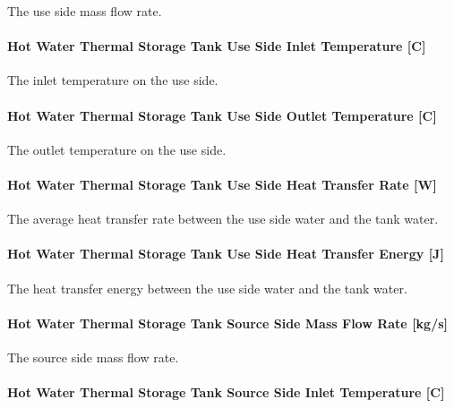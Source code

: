 The use side mass flow rate.

\paragraph{Hot Water Thermal Storage Tank Use Side Inlet Temperature
{[}C{]}}\label{hot-water-thermal-storage-use-side-inlet-temperature-thermalstoragehotwaterstratified}

The inlet temperature on the use side.

\paragraph{Hot Water Thermal Storage Tank Use Side Outlet Temperature
{[}C{]}}\label{hot-water-thermal-storage-use-side-outlet-temperature-thermalstoragehotwaterstratified}

The outlet temperature on the use side.

\paragraph{Hot Water Thermal Storage Tank Use Side Heat Transfer Rate
{[}W{]}}\label{hot-water-thermal-storage-use-side-heat-transfer-rate-thermalstoragehotwaterstratified}

The average heat transfer rate between the use side water and the tank water.

\paragraph{Hot Water Thermal Storage Tank Use Side Heat Transfer Energy
{[}J{]}}\label{hot-water-thermal-storage-use-side-heat-transfer-energy-thermalstoragehotwaterstratified}

The heat transfer energy between the use side water and the tank water.

\paragraph{Hot Water Thermal Storage Tank Source Side Mass Flow Rate
{[}kg/s{]}}\label{hot-water-thermal-storage-source-side-mass-flow-rate-thermalstoragehotwaterstratified}

The source side mass flow rate.

\paragraph{Hot Water Thermal Storage Tank Source Side Inlet Temperature
{[}C{]}}\label{hot-water-thermal-storage-source-side-inlet-temperature-thermalstoragehotwaterstratified}

